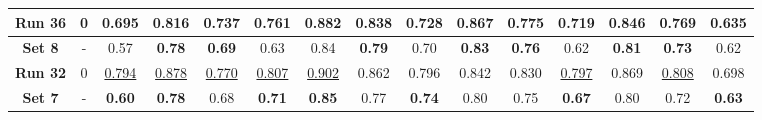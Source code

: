 \begin{table}[!ht]
{\begin{tabular}{|c|c|ccc|ccc|ccc|c|c|c|c|}
		\textbf{Run 36} & 0 & \multicolumn{1}{c|}{\textbf{0.695}} & \multicolumn{1}{c|}{0.816} & 0.737 & \multicolumn{1}{c|}{0.761} & \multicolumn{1}{c|}{\textbf{0.882}} & 0.838 & \multicolumn{1}{c|}{0.728} & \multicolumn{1}{c|}{0.867} & 0.775 & 0.719 & 0.846 & 0.769 & 0.635 \\
		
		\hline
		
		\textbf{Set 8} & - & \multicolumn{1}{c|}{0.57} & \multicolumn{1}{c|}{\textbf{0.78}} & \textbf{0.69} & \multicolumn{1}{c|}{0.63} & \multicolumn{1}{c|}{0.84} & \textbf{0.79} & \multicolumn{1}{c|}{0.70} & \multicolumn{1}{c|}{\textbf{0.83}} & \textbf{0.76} & 0.62 & \textbf{0.81} & \textbf{0.73} & 0.62 \\
		
		\hline
		\hline
		
		\textbf{Run 32} & 0 & \multicolumn{1}{c|}{\underline{0.794}} & \multicolumn{1}{c|}{\underline{0.878}} & \underline{0.770} & \multicolumn{1}{c|}{\underline{0.807}} & \multicolumn{1}{c|}{\underline{0.902}} & 0.862 & \multicolumn{1}{c|}{0.796} & \multicolumn{1}{c|}{0.842} & 0.830 & \underline{0.797} & 0.869 & \underline{0.808} & 0.698 \\
		
		\hline
		
		\textbf{Set 7} & - & \multicolumn{1}{c|}{\textbf{0.60}} & \multicolumn{1}{c|}{\textbf{0.78}} & 0.68 & \multicolumn{1}{c|}{\textbf{0.71}} & \multicolumn{1}{c|}{\textbf{0.85}} & 0.77 & \multicolumn{1}{c|}{\textbf{0.74}} & \multicolumn{1}{c|}{0.80} & 0.75 & \textbf{0.67} & 0.80 & 0.72 & \textbf{0.63} \\
		
		\hline
			
	\end{tabular}}
	\label{tab:Experiment1.3FourPatches5DegreeRotation}
\end{table}

